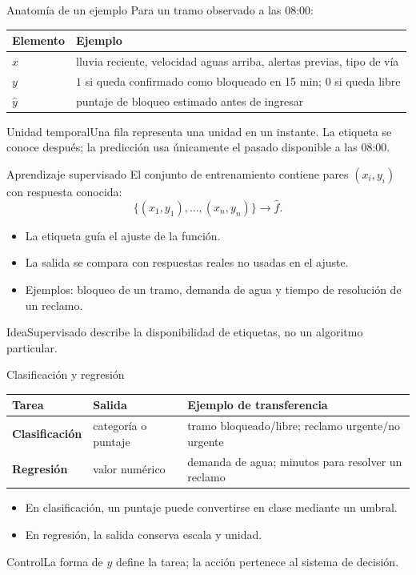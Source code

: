 \documentclass[aspectratio=169,10pt]{beamer}
\begin{document}
\begin{frame}{Anatomía de un ejemplo}
  \small Para un tramo observado a las 08:00:
  \begin{tabularx}{\textwidth}{>{\bfseries}p{}X}\toprule
  Elemento & Ejemplo\\\midrule
  $x$ & lluvia reciente, velocidad aguas arriba, alertas previas, tipo de vía\\
  $y$ & $1$ si queda confirmado como bloqueado en 15 min; $0$ si queda libre\\
  $\hat y$ & puntaje de bloqueo estimado antes de ingresar\\\bottomrule
  \end{tabularx}
  \begin{block}{Unidad temporal}Una fila representa una unidad en un instante. La etiqueta se conoce después; la predicción usa únicamente el pasado disponible a las 08:00.\end{block}
\end{frame}

\begin{frame}{Aprendizaje supervisado}
  \small El conjunto de entrenamiento contiene pares $(x_i,y_i)$ con respuesta conocida:
  \[\{(x_1,y_1),\ldots,(x_n,y_n)\}\longrightarrow\hat f.\]
  \begin{itemize}
    \item La etiqueta guía el ajuste de la función.
    \item La salida se compara con respuestas reales no usadas en el ajuste.
    \item Ejemplos: bloqueo de un tramo, demanda de agua y tiempo de resolución de un reclamo.
  \end{itemize}
  \begin{block}{Idea}Supervisado describe la disponibilidad de etiquetas, no un algoritmo particular.\end{block}
\end{frame}

\begin{frame}{Clasificación y regresión}
  \small
  \begin{tabularx}{\textwidth}{>{\bfseries}p{}p{}X}\toprule
  Tarea & Salida & Ejemplo de transferencia\\\midrule
  Clasificación & categoría o puntaje & tramo bloqueado/libre; reclamo urgente/no urgente\\
  Regresión & valor numérico & demanda de agua; minutos para resolver un reclamo\\\bottomrule
  \end{tabularx}
  \begin{itemize}\item En clasificación, un puntaje puede convertirse en clase mediante un umbral.\item En regresión, la salida conserva escala y unidad.\end{itemize}
  \begin{alertblock}{Control}La forma de $y$ define la tarea; la acción pertenece al sistema de decisión.\end{alertblock}
\end{frame}
\end{document}

